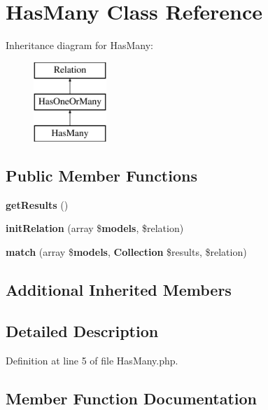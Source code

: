 \section{Has\+Many Class Reference}
\label{class_illuminate_1_1_database_1_1_eloquent_1_1_relations_1_1_has_many}
Inheritance diagram for Has\+Many\+:\begin{figure}[H]
\begin{center}
\leavevmode
\includegraphics[height=3.000000cm]{class_illuminate_1_1_database_1_1_eloquent_1_1_relations_1_1_has_many}
\end{center}
\end{figure}
\subsection*{Public Member Functions}
\begin{DoxyCompactItemize}
\item 
{\bf get\+Results} ()
\item 
{\bf init\+Relation} (array \${\bf models}, \$relation)
\item 
{\bf match} (array \${\bf models}, {\bf Collection} \$results, \$relation)
\end{DoxyCompactItemize}
\subsection*{Additional Inherited Members}


\subsection{Detailed Description}


Definition at line 5 of file Has\+Many.\+php.



\subsection{Member Function Documentation}
